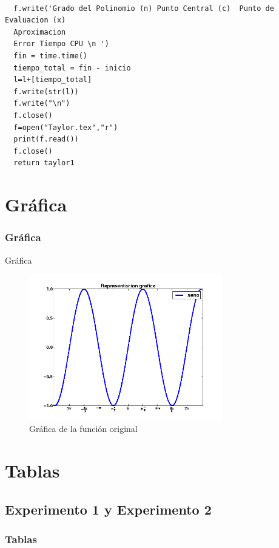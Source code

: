 \documentclass{beamer}
\begin{document}
{\begin{block}{ }

\begin{verbatim}

  f.write('Grado del Polinomio (n) Punto Central (c)  Punto de Evaluacion (x)  
  Aproximacion
  Error Tiempo CPU \n ')
  fin = time.time()
  tiempo_total = fin - inicio
  l=l+[tiempo_total]
  f.write(str(l))
  f.write("\n")
  f.close()
  f=open("Taylor.tex","r")
  print(f.read())
  f.close()
  return taylor1

\end{verbatim}
\end{block}
}
\section{Gráfica}
\frametitle{Gráfica}
\begin{block}{Gráfica}
\begin{center}
\begin{figure}[!th]
\includegraphics[width=0.75\textwidth]{images/grafica.png}
\caption{Gráfica de la función original}

\end{figure}
\end{center}
\end{block}

\section{Tablas}

\subsection{Experimento 1 y Experimento 2}
\begin{frame}
\frametitle{Tablas}


\end{frame}
\end{document}
